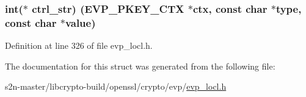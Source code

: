 \subsubsection[{\texorpdfstring{ctrl\+\_\+str}{ctrl_str}}]{\setlength{\rightskip}{0pt plus 5cm}int($\ast$ ctrl\+\_\+str) ({\bf E\+V\+P\+\_\+\+P\+K\+E\+Y\+\_\+\+C\+TX} $\ast$ctx, const char $\ast${\bf type}, const char $\ast$value)}\hypertarget{structevp__pkey__method__st_af114ec4cdf22ff5e9baa3eb5f0778604}{}\label{structevp__pkey__method__st_af114ec4cdf22ff5e9baa3eb5f0778604}


Definition at line 326 of file evp\+\_\+locl.\+h.



The documentation for this struct was generated from the following file\+:\begin{DoxyCompactItemize}
\item 
s2n-\/master/libcrypto-\/build/openssl/crypto/evp/\hyperlink{evp__locl_8h}{evp\+\_\+locl.\+h}\end{DoxyCompactItemize}
